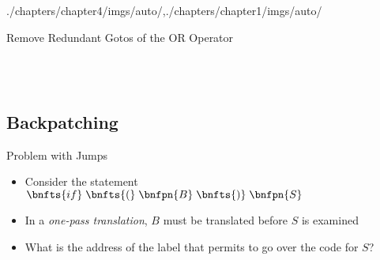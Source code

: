 \begin{graphicspathcontext}{{./chapters/chapter4/imgs/auto/},{./chapters/chapter1/imgs/auto/}}
\begin{bibunit}[apalike]
\begin{frame}[t]{Remove Redundant Gotos of the OR Operator}
	\begin{center}
		\begin{sdd}[.8\linewidth]
		\end{sdd} \\[.1cm]
		 \\[.1cm]
		\begin{sdd}[.8\linewidth]
		\end{sdd}
	\end{center}
\end{frame}

\subsection{Backpatching}
\resetsectionsintoc
\subsectiontableofcontentslide

\begin{frame}{Problem with Jumps}
	\vspace{1em}
	\begin{example}
		\begin{itemize}
		\item Consider the statement $\bnfts{if} \; \bnfts{(} \; \bnfpn{B} \; \bnfts{)} \; \bnfpn{S}$
		\item In a \emph{one-pass translation}, $B$ must be translated before $S$ is examined
		\item \alert{What is the address of the label that permits to go over the code for $S$?}
		\end{itemize}
	\end{example}
\end{frame}


\end{bibunit}
\end{graphicspathcontext}
